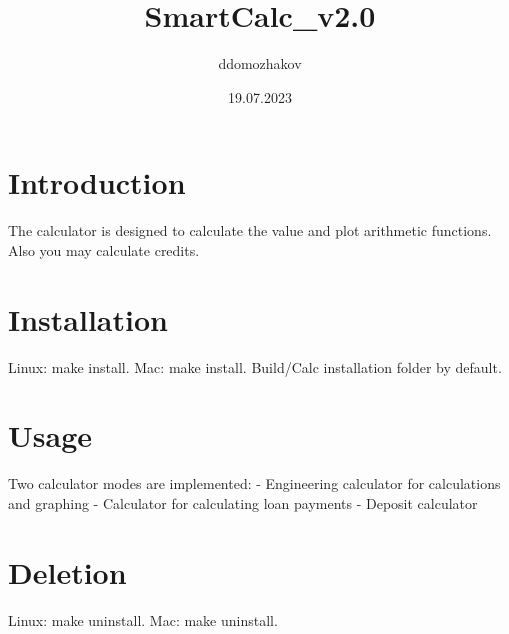 \documentclass{article}
\title{SmartCalc_v2.0}
\author{ddomozhakov}
\date{19.07.2023}
\begin{document}
  
\tableofcontents

\section{Introduction}
   
The calculator is designed to calculate the value and plot arithmetic functions.
Also you may calculate credits. 

\section*{Installation}

Linux: make install.
Mac: make install.
Build/Calc installation folder by default.

\section{Usage}
       
Two calculator modes are implemented:
 - Engineering calculator for calculations and graphing
 - Calculator for calculating loan payments
 - Deposit calculator

\section{Deletion}

Linux: make uninstall.
Mac: make uninstall. 
\end{document}
